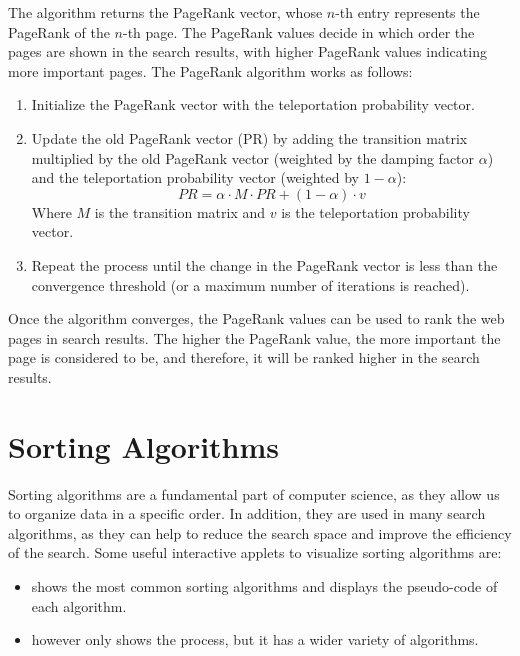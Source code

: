 The algorithm returns the PageRank vector, whose $n$-th entry represents the PageRank of the $n$-th page. The PageRank values decide in which order the pages are shown in the search results, with higher PageRank values indicating more important pages. The PageRank algorithm works as follows:
\begin{enumerate}
    \item Initialize the PageRank vector with the teleportation probability vector.
    \item Update the old PageRank vector (PR) by adding the transition matrix multiplied by the old PageRank vector (weighted by the damping factor $\alpha$) and the teleportation probability vector (weighted by $1-\alpha$):
    \begin{equation*}
        PR = \alpha \cdot M \cdot PR + (1 - \alpha) \cdot v
    \end{equation*}
    Where $M$ is the transition matrix and $v$ is the teleportation probability vector.
    \item Repeat the process until the change in the PageRank vector is less than the convergence threshold (or a maximum number of iterations is reached).
\end{enumerate}

Once the algorithm converges, the PageRank values can be used to rank the web pages in search results. The higher the PageRank value, the more important the page is considered to be, and therefore, it will be ranked higher in the search results.

\section{Sorting Algorithms}

Sorting algorithms are a fundamental part of computer science, as they allow us to organize data in a specific order. In addition, they are used in many search algorithms, as they can help to reduce the search space and improve the efficiency of the search. Some useful interactive applets to visualize sorting algorithms are:
\begin{itemize}
    \item {} shows the most common sorting algorithms and displays the pseudo-code of each algorithm.
    \item {} however only shows the process, but it has a wider variety of algorithms.
\end{itemize}
